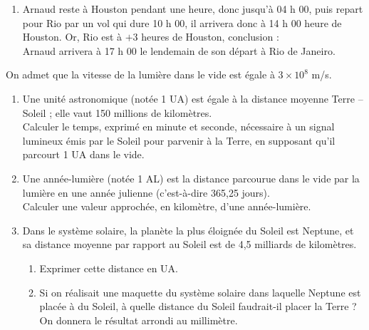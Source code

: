 \begin{corrige}
\begin{enumerate}
\begin{enumerate}
               {\blue La durée du vol entre Paris et Houston est de 11 heures}.
            \item Arnaud reste à Houston pendant une heure, donc jusqu'à 04 h 00, puis repart pour Rio par un vol qui dure 10 h 00, il arrivera donc à 14 h 00 heure de Houston. Or, Rio est à $+3$ heures de Houston, conclusion : \\
               {\blue Arnaud arrivera à 17 h 00 le lendemain de son départ à Rio de Janeiro}.
         \end{enumerate}
   \end{enumerate}
\end{corrige}

\bigskip


\begin{exercice}[CRPE 2016 G2] %
   On admet que la vitesse de la lumière dans le vide est égale à $3\times10^8$ m/s.
   \begin{enumerate}
      \item Une unité astronomique (notée 1 UA) est égale à la distance moyenne Terre -- Soleil ; elle vaut 150 millions de kilomètres. \\
         Calculer le temps, exprimé en minute et seconde, nécessaire à un signal lumineux émis par le Soleil pour parvenir à la Terre, en supposant qu’il parcourt 1 UA dans le vide.
      \item Une année-lumière (notée 1 AL) est la distance parcourue dans le vide par la lumière en une année julienne (c’est-à-dire 365,25 jours). \\
         Calculer une valeur approchée, en kilomètre, d’une année-lumière.
      \item Dans le système solaire, la planète la plus éloignée du Soleil est Neptune, et sa distance moyenne par rapport au Soleil est de 4,5 milliards de kilomètres.
         \begin{enumerate}
            \item Exprimer cette distance en UA.
            \item Si on réalisait une maquette du système solaire dans laquelle Neptune est placée à  du Soleil, à quelle distance du Soleil faudrait-il placer la Terre ? On donnera le résultat arrondi au millimètre.
         \end{enumerate}
   \end{enumerate}
\end{exercice}

